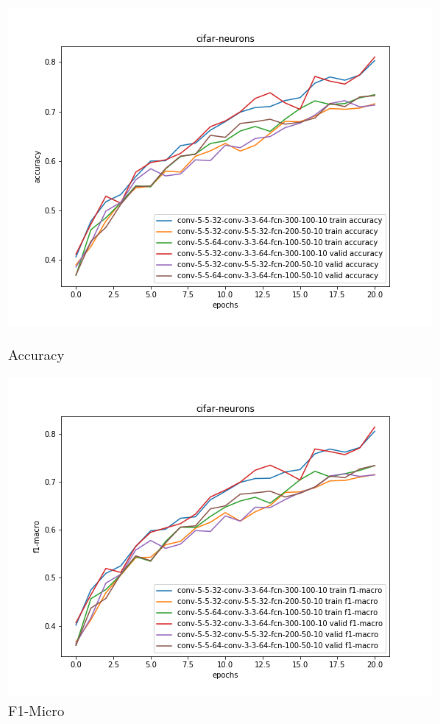 \documentclass{article}
\begin{document}
\begin{figure}[!htb]
	\includegraphics[width=\linewidth]{../output_plots/CIFAR/task-2/cifar-neurons-Accuracy-accuracy.png}
	\caption{Accuracy}\label{fig:part_2_task_2_accuracy}
	\endminipage\hfill
	\includegraphics[width=\linewidth]{../output_plots/CIFAR/task-2/cifar-neurons-F1-macro-score-f1-macro.png}
	\caption{F1-Micro}\label{fig:part_2_task_2_f1-micro}
	\endminipage

\end{figure}
\end{document}
